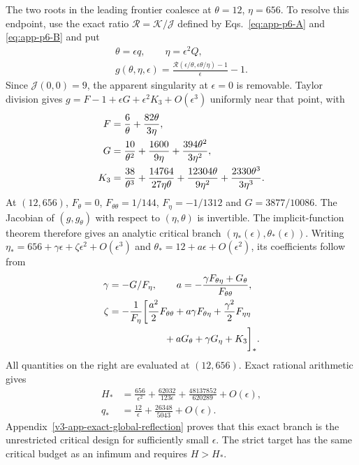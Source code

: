 \documentclass[aps,pre,reprint,amsmath,amssymb,longbibliography]{revtex4-2}
\begin{document}
The two roots in the leading frontier coalesce at
$\theta=12$, $\eta=656$. To resolve this endpoint, use the exact
ratio $\mathscr R=\mathcal K/\mathcal J$ defined by
Eqs.~\eqref{eq:app-p6-A} and \eqref{eq:app-p6-B} and put
\begin{equation}
 \begin{gathered}
 \theta=\epsilon q,\qquad \eta=\epsilon^2 Q,\\
 g(\theta,\eta,\epsilon)
 =\frac{\mathscr R(\epsilon/\theta,\epsilon\theta/\eta)-1}{\epsilon}-1.
 \end{gathered}
 \label{eq:app-fold-g-v2}
\end{equation}
Since $\mathcal J(0,0)=9$, the apparent singularity at $\epsilon=0$
is removable. Taylor division gives $g=F-1+\epsilon G+
\epsilon^2K_3+O(\epsilon^3)$ uniformly near that point, with
\begin{align}
 F&=\frac6\theta+\frac{82\theta}{3\eta},\notag\\
 G&=\frac{10}{\theta^2}+\frac{1600}{9\eta}
                         +\frac{394\theta^2}{3\eta^2},\notag\\
 K_3&=\frac{38}{\theta^3}+\frac{14764}{27\eta\theta}
          +\frac{12304\theta}{9\eta^2}+
                           \frac{2330\theta^3}{3\eta^3}.
 \label{eq:app-fold-series-v2}
\end{align}
At $(12,656)$, $F_\theta=0$, $F_{\theta\theta}=1/144$,
$F_\eta=-1/1312$ and $G=3877/10086$. The Jacobian of
$(g,g_\theta)$ with respect to $(\eta,\theta)$ is invertible.
The implicit-function theorem therefore gives an analytic critical
branch $(\eta_*(\epsilon),\theta_*(\epsilon))$. Writing
$\eta_*=656+\gamma\epsilon+\zeta\epsilon^2+O(\epsilon^3)$ and
$\theta_*=12+a\epsilon+O(\epsilon^2)$, its coefficients follow from
\begin{equation}
 \begin{aligned}
 \gamma&=-G/F_\eta,\qquad
 a=-\frac{\gamma F_{\theta\eta}+G_\theta}{F_{\theta\theta}},\\
 \zeta&=-\frac{1}{F_\eta}\biggl[
 \frac{a^2}{2}F_{\theta\theta}+a\gamma F_{\theta\eta}
       +\frac{\gamma^2}{2}F_{\eta\eta}\\
 &\hspace{20mm}+aG_\theta+\gamma G_\eta+K_3\biggr]_* .
 \end{aligned}
 \label{eq:app-fold-recursion-v2}
\end{equation}
All quantities on the right are evaluated at $(12,656)$.
Exact rational arithmetic gives
\begin{equation}
 \begin{aligned}
 H_*&=\frac{656}{\epsilon^2}+\frac{62032}{123\epsilon}
                  +\frac{48137852}{620289}+O(\epsilon),\\
 q_*&=\frac{12}{\epsilon}+\frac{26348}{5043}+O(\epsilon).
 \end{aligned}
 \label{eq:finite-budget-critical-v2}
\end{equation}
Appendix~\ref{v3-app-exact-global-reflection} proves that this exact
branch is the unrestricted critical design for sufficiently small
$\epsilon$. The strict target has the same critical budget as an
infimum and requires $H>H_*$.
\end{document}
